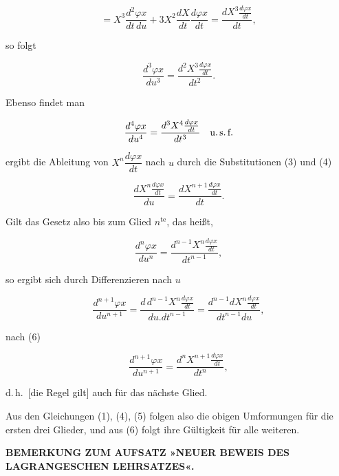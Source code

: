 
\[
= X^3\frac{d^2\varphi x}{dt\,du} + 3X^2\frac{dX}{dt}\frac{d\varphi x}{dt}
= \frac{dX^3 \frac{d\varphi x}{dt}}{dt},
\]

\noindent
so folgt

\begin{equation}\tag{5}
\frac{d^3\varphi x}{du^3} = \frac{d^2X^3 \frac{d\varphi x}{dt}}{dt^2}.
\end{equation}

\noindent\hspace*{\parindent}Ebenso findet man

\[
\frac{d^4\varphi x}{du^4} = \frac{d^3X^4 \frac{d\varphi x}{dt}}{dt^3} \quad \text{u.\,s.\,f.}
\]

\noindent\hspace*{\parindent} ergibt die Ableitung von $X^n\dfrac{d\varphi x}{dt}$ nach $u$ durch die
Substitutionen (3) und (4)

\begin{equation}\tag{6}
\frac{dX^n \frac{d\varphi x}{dt}}{du} = \frac{dX^{n+1} \frac{d\varphi x}{dt}}{dt}.
\end{equation}

\noindent
Gilt das Gesetz also bis zum Glied $n^{\text{te}}$, das heißt,

\[
\frac{d^n\varphi x}{du^n} = \frac{d^{n-1}X^n \frac{d\varphi x}{dt}}{dt^{n-1}},
\]

\noindent
so ergibt sich durch Differenzieren nach $u$

\[
\frac{d^{n+1}\varphi x}{du^{n+1}} = \frac{d\,d^{n-1}X^n\frac{d\varphi x}{dt}}{du . dt^{n-1}}
= \frac{d^{n-1}dX^n\frac{d\varphi x}{dt}}{dt^{n-1}du},
\]

\noindent
[also] nach (6)

\begin{equation}\tag{7}
\frac{d^{n+1}\varphi x}{du^{n+1}} = \frac{d^nX^{n+1} \frac{d\varphi x}{dt}}{dt^n},
\end{equation}

\noindent
d.\,h.\ [die Regel gilt] auch für das nächste Glied.

\noindent\hspace*{\parindent}Aus den Gleichungen (1), (4), (5) folgen also die obigen Umformungen für die ersten drei
Glieder, und aus (6) folgt ihre Gültigkeit für alle weiteren.

\medskip

\begin{center}
\textbf{BEMERKUNG ZUM AUFSATZ »NEUER BEWEIS DES LAGRANGESCHEN LEHRSATZES«.}
\end{center}

